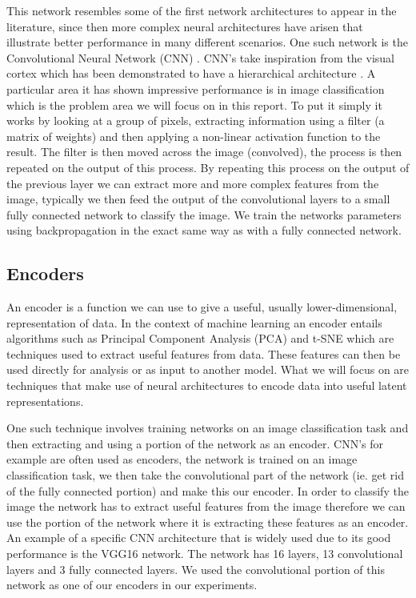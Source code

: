 This network resembles some of the first network architectures to appear in the literature, since then more complex neural architectures have arisen that illustrate better performance in many different scenarios. One such network is the Convolutional Neural Network (CNN) \cite{lecun1995convolutional}. CNN's take inspiration from the visual cortex which has been demonstrated to have a hierarchical architecture \cite{hubel1977ferrier}. A particular area it has shown impressive performance is in image classification which is the problem area we will focus on in this report. To put it simply it works by looking at a group of pixels, extracting information using a filter (a matrix of weights) and then applying a non-linear activation function to the result. The filter is then moved across the image (convolved), the process is then repeated on the output of this process. By repeating this process on the output of the previous layer we can extract more and more complex features from the image, typically we then feed the output of the convolutional layers to a small fully connected network to classify the image. We train the networks parameters using backpropagation in the exact same way as with a fully connected network.

\subsection{Encoders}
\label{subsec:encoders}
An encoder is a function we can use to give a useful, usually lower-dimensional, representation of data. In the context of machine learning an encoder entails algorithms such as Principal Component Analysis (PCA) \cite{hotelling1933analysis} and t-SNE \cite{van2008visualizing} which are techniques used to extract useful features from data. These features can then be used directly for analysis or as input to another model. What we will focus on are techniques that make use of neural architectures to encode data into useful latent representations. 

One such technique involves training networks on an image classification task and then extracting and using a portion of the network as an encoder. CNN's for example are often used as encoders, the network is trained on an image classification task, we then take the convolutional part of the network (ie. get rid of the fully connected portion) and make this our encoder. In order to classify the image the network has to extract useful features from the image therefore we can use the portion of the network where it is extracting these features as an encoder. An example of a specific CNN architecture that is widely used due to its good performance is the VGG16 \cite{simonyan2014very} network. The network has 16 layers, 13 convolutional layers and 3 fully connected layers. We used the convolutional portion of this network as one of our encoders in our experiments. 

